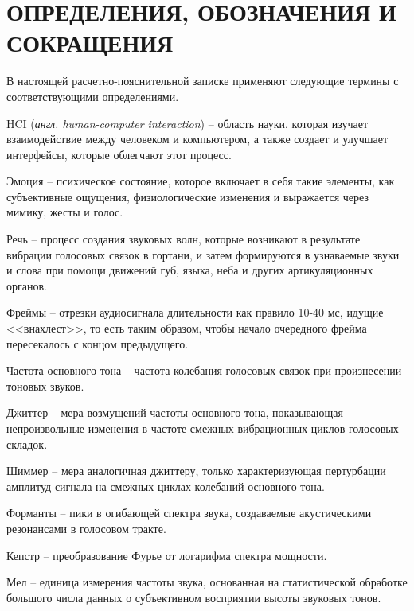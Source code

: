 \part*{ОПРЕДЕЛЕНИЯ, ОБОЗНАЧЕНИЯ И\\СОКРАЩЕНИЯ}

В настоящей расчетно-пояснительной записке применяют следующие термины с соответствующими определениями.

\begin{enumdescript}
	\item[HCI] (\textit{англ. human-computer interaction}) -- область науки, которая изучает взаимодействие между человеком и компьютером, а также создает и улучшает интерфейсы, которые облегчают этот процесс. 
	\item[Эмоция] -- психическое состояние, которое включает в себя такие элементы, как субъективные ощущения, физиологические изменения и выражается через мимику, жесты и голос. 
	\item[Речь] -- процесс создания звуковых волн, которые возникают в результате вибрации голосовых связок в гортани, и затем формируются в узнаваемые звуки и слова при помощи движений губ, языка, неба и других артикуляционных органов.
	\item[Фреймы] -- отрезки аудиосигнала длительности как правило 10-40 мс, идущие <<внахлест>>, то есть таким
	образом, чтобы начало очередного фрейма пересекалось с концом предыдущего. 
	\item[Частота основного тона] -- частота колебания голосовых связок при произнесении тоновых звуков.
	\item[Джиттер] -- мера возмущений частоты основного тона, показывающая непроизвольные изменения в частоте смежных вибрационных циклов голосовых складок.
	\item[Шиммер] -- мера аналогичная джиттеру, только характеризующая пертурбации амплитуд сигнала на смежных циклах колебаний основного тона.
	\item[Форманты] --  пики в огибающей спектра звука, создаваемые акустическими резонансами в голосовом тракте. 
	\item[Кепстр] -- преобразование Фурье от логарифма спектра мощности.
	\item[Мел] -- единица измерения частоты звука, основанная на статистической обработке большого числа данных о субъективном восприятии высоты звуковых тонов.

\end{enumdescript}
